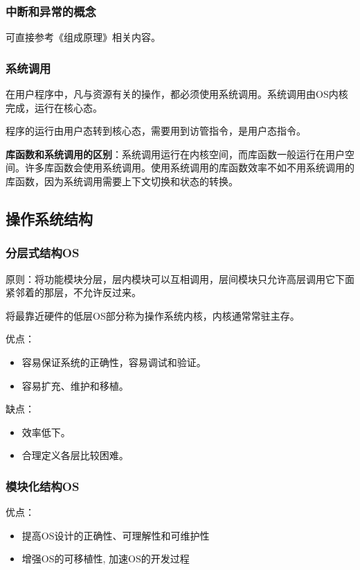\documentclass[12pt, a4paper, oneside]{ctexart}
\begin{document}
\subsubsection{中断和异常的概念}

可直接参考《组成原理》相关内容。

\subsubsection{系统调用}

在用户程序中，凡与资源有关的操作，都必须使用系统调用。系统调用由OS内核完成，运行在核心态。

程序的运行由用户态转到核心态，需要用到访管指令，是用户态指令。

\textbf{库函数和系统调用的区别}：系统调用运行在内核空间，而库函数一般运行在用户空间。许多库函数会使用系统调用。使用系统调用的库函数效率不如不用系统调用的库函数，因为系统调用需要上下文切换和状态的转换。

\subsection{操作系统结构}

\subsubsection{分层式结构OS}

原则：将功能模块分层，层内模块可以互相调用，层间模块只允许高层调用它下面紧邻着的那层，不允许反过来。

将最靠近硬件的低层OS部分称为操作系统内核，内核通常常驻主存。

优点：
\begin{itemize}
    \item 容易保证系统的正确性，容易调试和验证。
    \item 容易扩充、维护和移植。
\end{itemize}

缺点：
\begin{itemize}
  \item 效率低下。
  \item 合理定义各层比较困难。
\end{itemize}

\subsubsection{模块化结构OS}

优点：
\begin{itemize}
    \item 提高OS设计的正确性、可理解性和可维护性
    \item 增强OS的可移植性, 加速OS的开发过程
\end{itemize}
\end{document}
